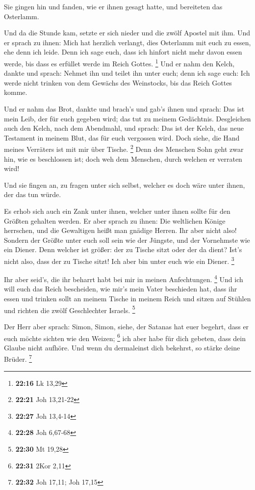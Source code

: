  Sie gingen hin und fanden, wie er ihnen gesagt hatte,
und bereiteten das Osterlamm.

 Und da die Stunde kam, setzte er sich nieder und die
zwölf Apostel mit ihm.  Und er sprach zu ihnen: Mich hat
herzlich verlangt, dies Osterlamm mit euch zu essen, ehe denn ich leide.
 Denn ich sage euch, dass ich hinfort nicht mehr davon
essen werde, bis dass es erfüllet werde im Reich Gottes. \footnote{\textbf{22:16}
  Lk 13,29}  Und er nahm den Kelch, dankte und sprach:
Nehmet ihn und teilet ihn unter euch;  denn ich sage
euch: Ich werde nicht trinken von dem Gewächs des Weinstocks, bis das
Reich Gottes komme.

 Und er nahm das Brot, dankte und brach's und gab's ihnen
und sprach: Das ist mein Leib, der für euch gegeben wird; das tut zu
meinem Gedächtnis.  Desgleichen auch den Kelch, nach dem
Abendmahl, und sprach: Das ist der Kelch, das neue Testament in meinem
Blut, das für euch vergossen wird.  Doch siehe, die Hand
meines Verräters ist mit mir über Tische. \footnote{\textbf{22:21} Joh
  13,21-22}  Denn des Menschen Sohn geht zwar hin, wie es
beschlossen ist; doch weh dem Menschen, durch welchen er verraten wird!

 Und sie fingen an, zu fragen unter sich selbst, welcher
es doch wäre unter ihnen, der das tun würde.

 Es erhob sich auch ein Zank unter ihnen, welcher unter
ihnen sollte für den Größten gehalten werden.  Er aber
sprach zu ihnen: Die weltlichen Könige herrschen, und die Gewaltigen
heißt man gnädige Herren.  Ihr aber nicht also! Sondern
der Größte unter euch soll sein wie der Jüngste, und der Vornehmste wie
ein Diener.  Denn welcher ist größer: der zu Tische sitzt
oder der da dient? Ist's nicht also, dass der zu Tische sitzt! Ich aber
bin unter euch wie ein Diener. \footnote{\textbf{22:27} Joh 13,4-14}

 Ihr aber seid's, die ihr beharrt habt bei mir in meinen
Anfechtungen. \footnote{\textbf{22:28} Joh 6,67-68}  Und
ich will euch das Reich bescheiden, wie mir's mein Vater beschieden hat,
 dass ihr essen und trinken sollt an meinem Tische in
meinem Reich und sitzen auf Stühlen und richten die zwölf Geschlechter
Israels. \footnote{\textbf{22:30} Mt 19,28}

 Der Herr aber sprach: Simon, Simon, siehe, der Satanas
hat euer begehrt, dass er euch möchte sichten wie den Weizen;
\footnote{\textbf{22:31} 2Kor 2,11}  ich aber habe für
dich gebeten, dass dein Glaube nicht aufhöre. Und wenn du dermaleinst
dich bekehrst, so stärke deine Brüder. \footnote{\textbf{22:32} Joh
  17,11; Joh 17,15}

